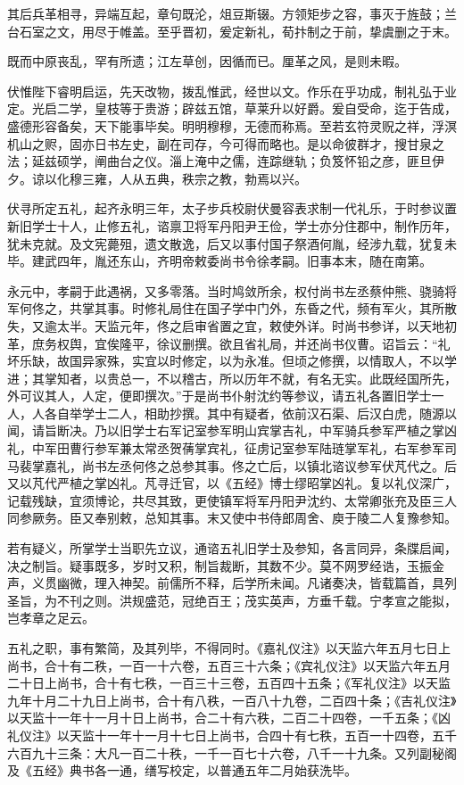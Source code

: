 \documentclass[12pt,UTF8]{ctexbook}
\begin{document}
其后兵革相寻，异端互起，章句既沦，俎豆斯辍。方领矩步之容，事灭于旌鼓；兰台石室之文，用尽于帷盖。至乎晋初，爰定新礼，荀抃制之于前，挚虞删之于末。

既而中原丧乱，罕有所遗；江左草创，因循而已。厘革之风，是则未暇。

伏惟陛下睿明启运，先天改物，拨乱惟武，经世以文。作乐在乎功成，制礼弘于业定。光启二学，皇枝等于贵游；辟兹五馆，草莱升以好爵。爰自受命，迄于告成，盛德形容备矣，天下能事毕矣。明明穆穆，无德而称焉。至若玄符灵贶之祥，浮溟机山之赆，固亦日书左史，副在司存，今可得而略也。是以命彼群才，搜甘泉之法；延兹硕学，阐曲台之仪。淄上淹中之儒，连踪继轨；负笈怀铅之彦，匪旦伊夕。谅以化穆三雍，人从五典，秩宗之教，勃焉以兴。

伏寻所定五礼，起齐永明三年，太子步兵校尉伏曼容表求制一代礼乐，于时参议置新旧学士十人，止修五礼，谘禀卫将军丹阳尹王俭，学士亦分住郡中，制作历年，犹未克就。及文宪薨殂，遗文散逸，后又以事付国子祭酒何胤，经涉九载，犹复未毕。建武四年，胤还东山，齐明帝敕委尚书令徐孝嗣。旧事本末，随在南第。

永元中，孝嗣于此遇祸，又多零落。当时鸠敛所余，权付尚书左丞蔡仲熊、骁骑将军何佟之，共掌其事。时修礼局住在国子学中门外，东昏之代，频有军火，其所散失，又逾太半。天监元年，佟之启审省置之宜，敕使外详。时尚书参详，以天地初革，庶务权舆，宜俟隆平，徐议删撰。欲且省礼局，并还尚书仪曹。诏旨云：“礼坏乐缺，故国异家殊，实宜以时修定，以为永准。但顷之修撰，以情取人，不以学进；其掌知者，以贵总一，不以稽古，所以历年不就，有名无实。此既经国所先，外可议其人，人定，便即撰次。”于是尚书仆射沈约等参议，请五礼各置旧学士一人，人各自举学士二人，相助抄撰。其中有疑者，依前汉石渠、后汉白虎，随源以闻，请旨断决。乃以旧学士右军记室参军明山宾掌吉礼，中军骑兵参军严植之掌凶礼，中军田曹行参军兼太常丞贺蒨掌宾礼，征虏记室参军陆琏掌军礼，右军参军司马裴掌嘉礼，尚书左丞何佟之总参其事。佟之亡后，以镇北谘议参军伏芃代之。后又以芃代严植之掌凶礼。芃寻迁官，以《五经》博士缪昭掌凶礼。复以礼仪深广，记载残缺，宜须博论，共尽其致，更使镇军将军丹阳尹沈约、太常卿张充及臣三人同参厥务。臣又奉别敕，总知其事。末又使中书侍郎周舍、庾于陵二人复豫参知。

若有疑义，所掌学士当职先立议，通谘五礼旧学士及参知，各言同异，条牒启闻，决之制旨。疑事既多，岁时又积，制旨裁断，其数不少。莫不网罗经诰，玉振金声，义贯幽微，理入神契。前儒所不释，后学所未闻。凡诸奏决，皆载篇首，具列圣旨，为不刊之则。洪规盛范，冠绝百王；茂实英声，方垂千载。宁孝宣之能拟，岂孝章之足云。

五礼之职，事有繁简，及其列毕，不得同时。《嘉礼仪注》以天监六年五月七日上尚书，合十有二秩，一百一十六卷，五百三十六条；《宾礼仪注》以天监六年五月二十日上尚书，合十有七秩，一百三十三卷，五百四十五条；《军礼仪注》以天监九年十月二十九日上尚书，合十有八秩，一百八十九卷，二百四十条；《吉礼仪注》以天监十一年十一月十日上尚书，合二十有六秩，二百二十四卷，一千五条；《凶礼仪注》以天监十一年十一月十七日上尚书，合四十有七秩，五百一十四卷，五千六百九十三条：大凡一百二十秩，一千一百七十六卷，八千一十九条。又列副秘阁及《五经》典书各一通，缮写校定，以普通五年二月始获洗毕。
\end{document}
